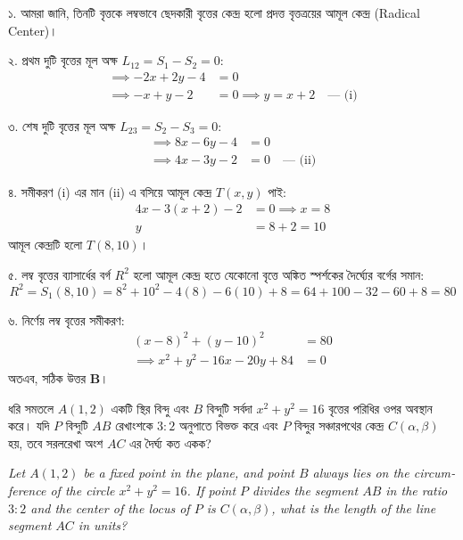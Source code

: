 \documentclass[12pt, a4paper]{article}
\begin{document}
\begin{tcolorbox}[solutionbox={সমাধান (Solution)}]
    \noindent
    ১. আমরা জানি, তিনটি বৃত্তকে লম্বভাবে ছেদকারী বৃত্তের কেন্দ্র হলো প্রদত্ত বৃত্তত্রয়ের আমূল কেন্দ্র (Radical Center)। 
    
    ২. প্রথম দুটি বৃত্তের মূল অক্ষ $L_{12} = S_1 - S_2 = 0$:
    \begin{align*}
        \implies -2x + 2y - 4 &= 0 \\
        \implies -x + y - 2 &= 0 \implies y = x + 2 \quad \text{--- (i)}
    \end{align*}
    
    ৩. শেষ দুটি বৃত্তের মূল অক্ষ $L_{23} = S_2 - S_3 = 0$:
    \begin{align*}
        \implies 8x - 6y - 4 &= 0 \\
        \implies 4x - 3y - 2 &= 0 \quad \text{--- (ii)}
    \end{align*}
    
    ৪. সমীকরণ (i) এর মান (ii) এ বসিয়ে আমূল কেন্দ্র $T(x, y)$ পাই:
    \begin{align*}
        4x - 3(x + 2) - 2 &= 0 \implies x = 8 \\
        y &= 8 + 2 = 10
    \end{align*}
    আমূল কেন্দ্রটি হলো $T(8, 10)$। 
    
    ৫. লম্ব বৃত্তের ব্যাসার্ধের বর্গ $R^2$ হলো আমূল কেন্দ্র হতে যেকোনো বৃত্তে অঙ্কিত স্পর্শকের দৈর্ঘ্যের বর্গের সমান:
    \[ R^2 = S_1(8, 10) = 8^2 + 10^2 - 4(8) - 6(10) + 8 = 64 + 100 - 32 - 60 + 8 = 80 \]
    
    ৬. নির্ণেয় লম্ব বৃত্তের সমীকরণ:
    \begin{align*}
        (x - 8)^2 + (y - 10)^2 &= 80 \\
        \implies x^2 + y^2 - 16x - 20y + 84 &= 0
    \end{align*}
    অতএব, সঠিক উত্তর \textbf{B}।
\end{tcolorbox}

\begin{tcolorbox}[questionbox={প্রশ্ন (Question) 49}]
    \noindent
    ধরি সমতলে $A(1, 2)$ একটি স্থির বিন্দু এবং $B$ বিন্দুটি সর্বদা $x^2 + y^2 = 16$ বৃত্তের পরিধির ওপর অবস্থান করে। যদি $P$ বিন্দুটি $AB$ রেখাংশকে $3:2$ অনুপাতে বিভক্ত করে এবং $P$ বিন্দুর সঞ্চারপথের কেন্দ্র $C(\alpha, \beta)$ হয়, তবে সরলরেখা অংশ $AC$ এর দৈর্ঘ্য কত একক?
    
    \vspace{0.8em}
    \begin{english}
    \noindent\textit{\color{darkgray}
    Let $A(1, 2)$ be a fixed point in the plane, and point $B$ always lies on the circumference of the circle $x^2 + y^2 = 16$. If point $P$ divides the segment $AB$ in the ratio $3:2$ and the center of the locus of $P$ is $C(\alpha, \beta)$, what is the length of the line segment $AC$ in units?
    }
    \end{english}
\end{tcolorbox}
\end{document}
